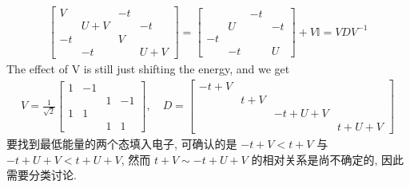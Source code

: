 \documentclass[../../main.tex]{subfiles}
\begin{document}
\begin{enumerate}
{{  \begin{align*}
    \begin{bmatrix}
       V &    & -t &   \\
         & U + V&  & -t\\
      -t &    &  V &   \\
         & -t &    & U + V
    \end{bmatrix} = \begin{bmatrix}
        &    & -t &   \\
        & U  &    & -t\\
     -t &    &    &   \\
        & -t &    & U 
   \end{bmatrix} + V\mathbb{I} = VDV^{-1}
  \end{align*}
  The effect of V is still just shifting the energy, and we get
  \begin{align*}
    V = \frac{1}{\sqrt{2}}\begin{bmatrix}
   1  &-1 &   &   \\
      &   & 1 &-1 \\
   1  & 1 &   &   \\
      &   & 1 & 1 
  \end{bmatrix},\quad D = \begin{bmatrix}
    -t + V  &  &   & \\
     & t + V &  &  \\
      &  & -t + U + V &  \\
     &   &  & t + U + V
  \end{bmatrix}
  \end{align*}
  要找到最低能量的两个态填入电子, 可确认的是 $-t+V<t+V$ 与 $-t+U+V<t+U+V$, 然而 $t+V\sim -t+U+V$ 的相对关系是尚不确定的, 因此需要分类讨论.
  }}
\end{enumerate}
\end{document}
